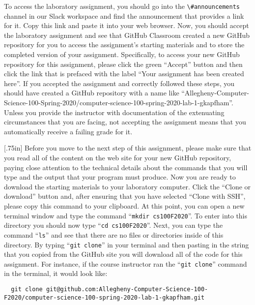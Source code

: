 \documentclass[11pt]{article}
\newcommand{\command}[1]{``\lstinline{#1}''}
\newcommand{\channel}[1]{\lstinline{#1}}
\newcommand{\caution}[1]{\null\hfill\LARGE{\faWarning{}}\newline\scriptsize{\em{#1}}}
\begin{document}
To access the laboratory assignment, you should go into the
\channel{\#announcements} channel in our Slack workspace and find the
announcement that provides a link for it. Copy this link and paste it into your
web browser. Now, you should accept the laboratory assignment and see that
GitHub Classroom created a new GitHub repository for you to access the
assignment's starting materials and to store the completed version of your
assignment. Specifically, to access your new GitHub repository for this
assignment, please click the green ``Accept'' button and then click the link
that is prefaced with the label ``Your assignment has been created here''. If
you accepted the assignment and correctly followed these steps, you should have
created a GitHub repository with a name like
``Allegheny-Computer-Science-100-Spring-2020/computer-science-100-spring-2020-lab-1-gkapfham''.
Unless you provide the instructor with documentation of the extenuating
circumstances that you are facing, not accepting the assignment means that you
automatically receive a failing grade for it.

\marginnote{\caution{Clone GitHub repository}}[.75in] Before you move to the
next step of this assignment, please make sure that you read all of the content
on the web site for your new GitHub repository, paying close attention to the
technical details about the commands that you will type and the output that
your program must produce. Now you are ready to download the starting materials
to your laboratory computer. Click the ``Clone or download'' button and, after
ensuring that you have selected ``Clone with SSH'', please copy this command to
your clipboard. At this point, you can open a new terminal window and type the
command \command{mkdir cs100F2020}. To enter into this directory you should now
type \command{cd cs100F2020}. Next, you can type the command \command{ls} and
see that there are no files or directories inside of this directory. By typing
\command{git clone} in your terminal and then pasting in the string that you
copied from the GitHub site you will download all of the code for this
assignment. For instance, if the course instructor ran the \command{git clone}
command in the terminal, it would look like:

\begin{lstlisting}
  git clone git@github.com:Allegheny-Computer-Science-100-F2020/computer-science-100-spring-2020-lab-1-gkapfham.git
\end{lstlisting}
\end{document}
